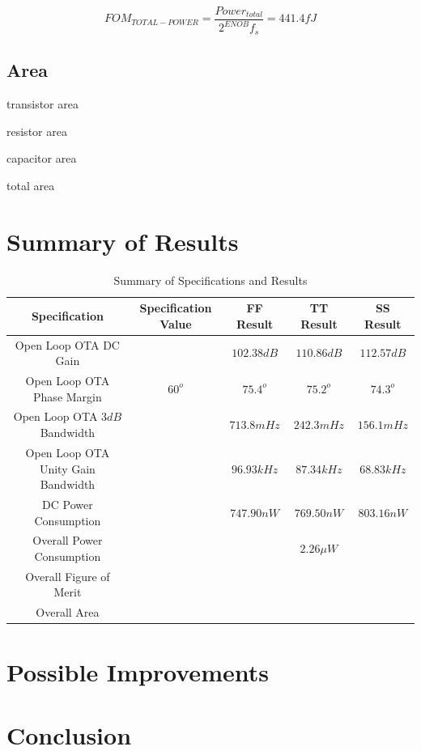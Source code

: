 \documentclass[journal]{IEEEtran}
\begin{document}
\begin{equation}
FOM_{TOTAL-POWER} = \frac{Power_{total}}{2^{ENOB}f_s} = 441.4 fJ
\end{equation}

\subsection{Area}
transistor area

resistor area

capacitor area

total area

\section{Summary of Results}

\begin{table}
\centering
\caption{Summary of Specifications and Results}
\label{tab:specs_results}
\begin{tabular}{|c|c|c|c|c|}
\hline Specification & Specification Value & FF Result & TT Result & SS Result\\ 
\hline Open Loop OTA DC Gain &  &$102.38 dB$&$110.86 dB$&$112.57 dB$\\ 
\hline Open Loop OTA Phase Margin & $60^o$ & $75.4^o$ & $75.2^o$ & $74.3^o$ \\ 
\hline Open Loop OTA $3dB$ Bandwidth &  & $713.8mHz$ & $242.3 mHz$ & $156.1mHz$\\ 
\hline Open Loop OTA Unity Gain Bandwidth &  & $96.93kHz$ & $87.34 kHz$ &  $68.83 kHz$ \\ 
\hline DC Power Consumption &  & $747.90 nW$ & $769.50 nW$ & $803.16 nW$\\ 
\hline Overall Power Consumption &  &  & $2.26\mu W$ & \\ 
\hline Overall Figure of Merit &  & &  & \\ 
\hline Overall Area &  & &  & \\ 
\hline 
\end{tabular} 
\end{table}


\section{Possible Improvements}

\section{Conclusion}
\end{document}
